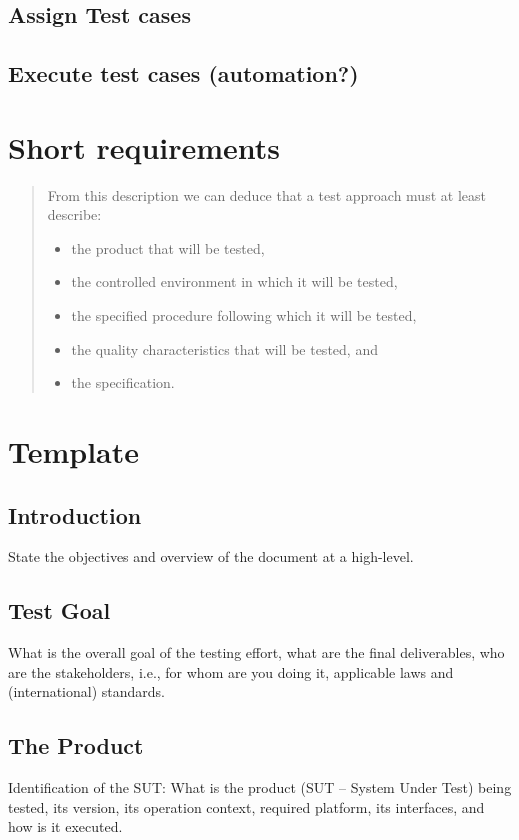 \documentclass[11pt,a4paper]{article}
\begin{document}
\subsection{Assign Test cases}
\label{sec:orgheadline14}
\subsection{Execute test cases (automation?)}
\label{sec:orgheadline15}
\section{Short requirements}
\label{sec:orgheadline17}
\begin{quote}
From this description we can deduce that a test approach must at least describe:
\begin{itemize}
\item the product that will be tested,
\item the controlled environment in which it will be tested,
\item the specified procedure following which it will be tested,
\item the quality characteristics that will be tested, and
\item the specification.
\end{itemize}
\end{quote}

\section{Template}
\label{sec:orgheadline32}
\subsection{Introduction}
\label{sec:orgheadline18}
State the objectives and overview of the document at a high-level.
\subsection{Test Goal}
\label{sec:orgheadline19}
What is the overall goal of the testing effort, what are the final deliverables, who are the
stakeholders, i.e., for whom are you doing it, applicable laws and (international) standards.
\subsection{The Product}
\label{sec:orgheadline20}
Identification of the SUT: What is the product (SUT – System Under Test) being tested, its
version, its operation context, required platform, its interfaces, and how is it executed.
\end{document}
